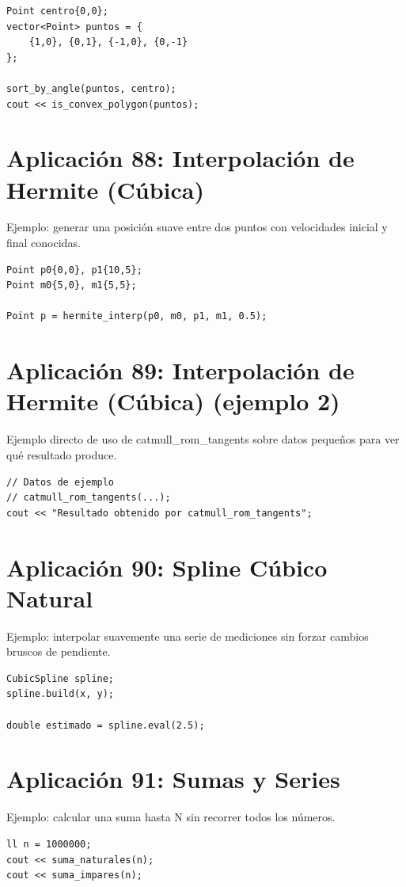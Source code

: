 \documentclass[10pt,twocolumn,letterpaper]{report}
\begin{document}
\begin{lstlisting}
Point centro{0,0};
vector<Point> puntos = {
    {1,0}, {0,1}, {-1,0}, {0,-1}
};

sort_by_angle(puntos, centro);
cout << is_convex_polygon(puntos);
\end{lstlisting}

\section{Aplicación 88: Interpolación de Hermite (Cúbica)}
Ejemplo: generar una posición suave entre dos puntos con velocidades inicial y final conocidas.

\begin{lstlisting}
Point p0{0,0}, p1{10,5};
Point m0{5,0}, m1{5,5};

Point p = hermite_interp(p0, m0, p1, m1, 0.5);
\end{lstlisting}

\section{Aplicación 89: Interpolación de Hermite (Cúbica) (ejemplo 2)}
Ejemplo directo de uso de catmull\_rom\_tangents sobre datos pequeños para ver qué resultado produce.

\begin{lstlisting}
// Datos de ejemplo
// catmull_rom_tangents(...);
cout << "Resultado obtenido por catmull_rom_tangents";
\end{lstlisting}

\section{Aplicación 90: Spline Cúbico Natural}
Ejemplo: interpolar suavemente una serie de mediciones sin forzar cambios bruscos de pendiente.

\begin{lstlisting}
CubicSpline spline;
spline.build(x, y);

double estimado = spline.eval(2.5);
\end{lstlisting}

\section{Aplicación 91: Sumas y Series}
Ejemplo: calcular una suma hasta N sin recorrer todos los números.

\begin{lstlisting}
ll n = 1000000;
cout << suma_naturales(n);
cout << suma_impares(n);
\end{lstlisting}
\end{document}
